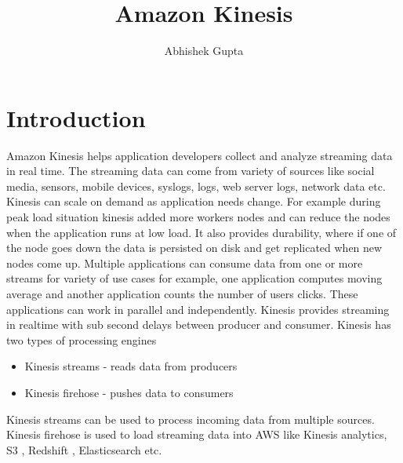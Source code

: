 \documentclass[9pt,twocolumn,twoside]{../../styles/osajnl}
\title{Amazon Kinesis}
\author[1,*]{Abhishek Gupta}
\affil[1]{School of Informatics and Computing, Bloomington, IN 47408, U.S.A.}
\affil[*]{Corresponding authors: abhigupt@iu.edu}
\begin{document}
\maketitle



\section{Introduction}
Amazon Kinesis \cite{www-kinesis} helps application developers collect and
analyze streaming data in real time. The streaming data can come from variety of
sources like social media, sensors, mobile devices, syslogs, logs, web server
logs, network data etc. Kinesis can scale on demand as application needs change.
For example during peak load situation kinesis added more workers nodes and can
reduce the nodes when the application runs at low load. It also provides
durability, where if one of the node goes down the data is persisted on disk and
get replicated when new nodes come up. Multiple applications can consume data
from one or more streams for variety of use cases for example, one application
computes moving average and another application counts the number of users
clicks. These applications can work in parallel and independently. Kinesis
provides streaming in realtime with sub second \SE
{} delays between producer and
consumer. Kinesis has two types of processing engines
\begin{itemize}
	\item Kinesis streams - reads data from producers
	\item Kinesis firehose - pushes data to consumers
\end{itemize}

Kinesis streams can be used to process incoming data from multiple sources.
Kinesis firehose is used to load streaming data into AWS \CE like Kinesis analytics,
S3 \CE, Redshift \CE, Elasticsearch \CE etc.
\end{document}
